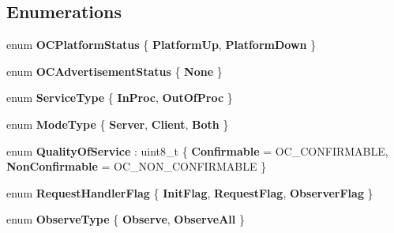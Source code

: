 \subsection*{Enumerations}
\begin{DoxyCompactItemize}
\item 
\hypertarget{namespaceOC_a818488f0dea9cf377962d476712b8437}{}enum {\bfseries O\+C\+Platform\+Status} \{ {\bfseries Platform\+Up}, 
{\bfseries Platform\+Down}
 \}\label{namespaceOC_a818488f0dea9cf377962d476712b8437}

\item 
\hypertarget{namespaceOC_ac666a65aaf2207f00071a72c1d3d0a47}{}enum {\bfseries O\+C\+Advertisement\+Status} \{ {\bfseries None}
 \}\label{namespaceOC_ac666a65aaf2207f00071a72c1d3d0a47}

\item 
\hypertarget{namespaceOC_a6b26d3fd1265b9404ea949556c7803c6}{}enum {\bfseries Service\+Type} \{ {\bfseries In\+Proc}, 
{\bfseries Out\+Of\+Proc}
 \}\label{namespaceOC_a6b26d3fd1265b9404ea949556c7803c6}

\item 
\hypertarget{namespaceOC_a4addb2b99e14aaace7bf2d16e5cdcbf4}{}enum {\bfseries Mode\+Type} \{ {\bfseries Server}, 
{\bfseries Client}, 
{\bfseries Both}
 \}\label{namespaceOC_a4addb2b99e14aaace7bf2d16e5cdcbf4}

\item 
\hypertarget{namespaceOC_aa6b5415cd75a9061b546d8c5e6faebde}{}enum {\bfseries Quality\+Of\+Service} \+: uint8\+\_\+t \{ {\bfseries Confirmable} = O\+C\+\_\+\+C\+O\+N\+F\+I\+R\+M\+A\+B\+L\+E, 
{\bfseries Non\+Confirmable} = O\+C\+\_\+\+N\+O\+N\+\_\+\+C\+O\+N\+F\+I\+R\+M\+A\+B\+L\+E
 \}\label{namespaceOC_aa6b5415cd75a9061b546d8c5e6faebde}

\item 
\hypertarget{namespaceOC_a23aa7c4621d163b3c35b3ccf0ed45972}{}enum {\bfseries Request\+Handler\+Flag} \{ {\bfseries Init\+Flag}, 
{\bfseries Request\+Flag}, 
{\bfseries Observer\+Flag}
 \}\label{namespaceOC_a23aa7c4621d163b3c35b3ccf0ed45972}

\item 
\hypertarget{namespaceOC_a7e94a8d2bbe718ec9df27fc86ae7b556}{}enum {\bfseries Observe\+Type} \{ {\bfseries Observe}, 
{\bfseries Observe\+All}
 \}\label{namespaceOC_a7e94a8d2bbe718ec9df27fc86ae7b556}

\end{DoxyCompactItemize}
